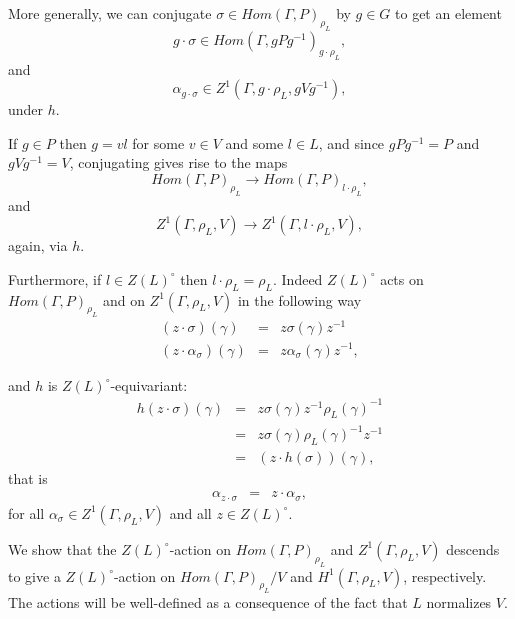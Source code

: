 More generally, we can conjugate $\sigma\in Hom(\Gamma, P)_{\rho_L}$ by $g \in G$ to get an element 
\begin{displaymath}
  g \cdot \sigma \in Hom(\Gamma, gPg^{-1})_{g\cdot\rho_L},
\end{displaymath}
and
\begin{displaymath}
  \alpha_{g \cdot \sigma} \in Z^1(\Gamma, g\cdot\rho_L, gVg^{-1}),
\end{displaymath}
under $h$.

If $g\in P$ then $g=vl$ for some $v\in V$ and some $l\in L$, and since $gPg^{-1} = P$ and $gVg^{-1} = V$, conjugating gives rise to the maps
\begin{displaymath}
  Hom(\Gamma, P)_{\rho_L} \rightarrow Hom(\Gamma, P)_{l\cdot\rho_L},
\end{displaymath}
and
\begin{displaymath}
  Z^1(\Gamma, \rho_L, V)\rightarrow Z^1(\Gamma, l\cdot\rho_L, V),
\end{displaymath}
again, via $h$.

Furthermore, if $l\in Z(L)^\circ$ then $l\cdot\rho_L = \rho_L$. Indeed $Z(L)^\circ$ acts on $Hom(\Gamma, P)_{\rho_L}$ and on $Z^1(\Gamma, \rho_L, V)$ in the following way
\begin{eqnarray*}
  (z \cdot \sigma) (\gamma) &=& z \sigma(\gamma) z^{-1} \\
  (z \cdot \alpha_\sigma) (\gamma) &=&  z \alpha_\sigma(\gamma) z^{-1},
\end{eqnarray*}

and $h$ is $Z(L)^\circ$-equivariant:
\begin{eqnarray*}
  h(z \cdot \sigma)(\gamma) &=&  z \sigma(\gamma) z^{-1} \rho_L(\gamma)^{-1} \\
  &=& z \sigma(\gamma) \rho_L(\gamma)^{-1} z^{-1} \\
  &=& (z \cdot h(\sigma))(\gamma),
\end{eqnarray*}
that is
\begin{eqnarray}
  \alpha_{z \cdot \sigma} &=& z \cdot \alpha_\sigma,
  \label{eqn:h_z_equivar}
\end{eqnarray}
for all $\alpha_\sigma \in Z^1(\Gamma, \rho_L, V)$ and all $z \in Z(L)^\circ$.

We show that the $Z(L)^\circ$-action on $Hom(\Gamma, P)_{\rho_L}$ and $Z^1(\Gamma, \rho_L, V)$ descends to give a $Z(L)^\circ$-action on $Hom(\Gamma, P)_{\rho_L}/V$ and $H^1(\Gamma, \rho_L, V)$, respectively. The actions will be well-defined as a consequence of the fact that $L$ normalizes $V$.

